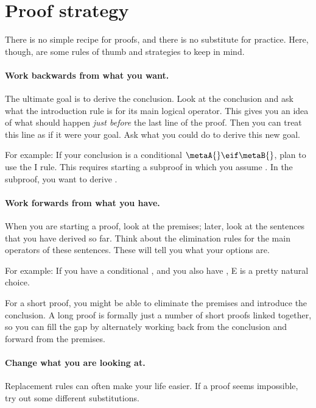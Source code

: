 \section{Proof strategy}
\label{sec.SL.ND.strategy}





There is no simple recipe for proofs, and there is no substitute for practice. Here, though, are some rules of thumb and strategies to keep in mind.

\paragraph{Work backwards from what you want.}
The ultimate goal is to derive the conclusion. Look at the conclusion and ask what the introduction rule is for its main logical operator. This gives you an idea of what should happen \emph{just before} the last line of the proof. Then you can treat this line as if it were your goal. Ask what you could do to derive this new goal.

For example: If your conclusion is a conditional $\metaA{}\eif\metaB{}$, plan to use the {\eif}I rule. This requires starting a subproof in which you assume \metaA{}. In the subproof, you want to derive \metaB{}.

\paragraph{Work forwards from what you have.}
When you are starting a proof, look at the premises; later, look at the sentences that you have derived so far. Think about the elimination rules for the main operators of these sentences. These will tell you what your options are.

For example: If you have a conditional \metaA{}\eif\metaB{}, and you also have \metaA{}, {\eif}E is a pretty natural choice.

For a short proof, you might be able to eliminate the premises and introduce the conclusion. A long proof is formally just a number of short proofs linked together, so you can fill the gap by alternately working back from the conclusion and forward from the premises.


\paragraph{Change what you are looking at.}
Replacement rules can often make your life easier. If a proof seems impossible, try out some different substitutions.

